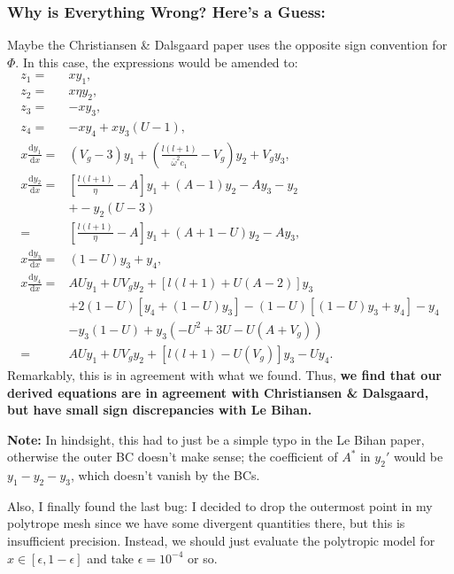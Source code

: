 \documentclass[11pt,
        usenames, %
        twocolumn,
        landscape,
        dvipsnames %
    ]{article}
\newcommand*{\rd}[2]{\frac{\mathrm{d}#1}{\mathrm{d}#2}}
\newcommand*{\p}[1]{\left(#1\right)}
\newcommand*{\s}[1]{\left[#1\right]}
\begin{document}
\subsubsection{Why is Everything Wrong? Here's a Guess:}

Maybe the Christiansen \& Dalsgaard paper uses the opposite sign convention for
$\Phi$. In this case, the expressions would be amended to:
\begin{align}
    z_1 ={}& xy_1,\\
    z_2 ={}& x\eta y_2,\\
    z_3 ={}& -xy_3,\\
    z_4 ={}& -xy_4 + xy_3(U - 1),\\
    x\rd{y_1}{x} ={}& \p{V_g - 3}y_1
        + \p{\frac{l(l+1)}{\bar{\omega}^2c_1} - V_g}y_2
        + V_gy_3,\\
    x\rd{y_2}{x}
        ={}& \s{\frac{l(l+1)}{\eta} - A}y_1
                + (A - 1)y_2
                - Ay_3
                - y_2\nonumber\\
            &+ - y_2(U - 3)\nonumber\\
        ={}& \s{\frac{l(l+1)}{\eta} - A}y_1
                + (A + 1 - U)y_2
                - Ay_3,\\
    x\rd{y_3}{x} ={}& (1 - U)y_3 + y_4,\\
    x\rd{y_4}{x} ={}& AUy_1
            + UV_gy_2
            + \s{l(l+1) + U(A - 2)}y_3\nonumber\\
            &+ 2(1 - U)\s{y_4 + (1 - U)y_3}
            - (1 - U)\s{(1 - U)y_3 + y_4}
            - y_4\nonumber\\
            &- y_3(1 - U)
            + y_3\p{-U^2 + 3U - U(A + V_g)}\nonumber\\
        ={}& AUy_1
            + UV_gy_2
            + \s{l(l+1) - U(V_g) }y_3 - Uy_4.
\end{align}
Remarkably, this is in agreement with what we found. Thus, \textbf{we find that
our derived equations are in agreement with Christiansen \& Dalsgaard, but have
small sign discrepancies with Le Bihan.}

\textbf{Note:} In hindsight, this had to just be a simple typo in the Le Bihan
paper, otherwise the outer BC doesn't make sense; the coefficient of $A^*$ in
$y_2'$ would be $y_1 - y_2 - y_3$, which doesn't vanish by the BCs.

Also, I finally found the last bug: I decided to drop the outermost point in my
polytrope mesh since we have some divergent quantities there, but this is
insufficient precision. Instead, we should just evaluate the polytropic model
for $x \in \s{\epsilon, 1 - \epsilon}$ and take $\epsilon = 10^{-4}$ or so.
\end{document}
